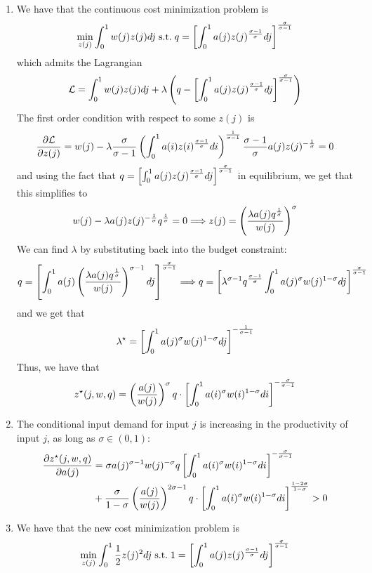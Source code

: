 \documentclass[12pt]{article}
\begin{document}
\begin{enumerate}
	\begin{enumerate}
		\item We have that the continuous cost minimization problem is
		\[
		\min_{z(j)} \int_0^1 w(j)z(j)dj \;\text{s.t.}\; q = \left[ \int_0^1 a(j) z(j)^\frac{\sigma-1}{\sigma} dj \right]^\frac{\sigma}{\sigma-1}
		\]
		which admits the Lagrangian
		\[
		\mathcal{L} = \int_0^1 w(j)z(j)dj + \lambda \left( q - \left[ \int_0^1 a(j) z(j)^\frac{\sigma-1}{\sigma} dj \right]^\frac{\sigma}{\sigma-1} \right)
		\]
		The first order condition with respect to some $z(j)$ is
		\[
		\frac{\partial \mathcal{L}}{\partial z(j)} = w(j) - \lambda \frac{\sigma}{\sigma - 1} \left( \int_0^1 a(i) z(i)^\frac{\sigma - 1}{\sigma}di \right)^\frac{1}{\sigma - 1} \frac{\sigma - 1}{\sigma} a(j) z(j)^{-\frac{1}{\sigma}} = 0
		\]
		and using the fact that $q = \left[ \int_0^1 a(j) z(j)^\frac{\sigma-1}{\sigma} dj \right]^\frac{\sigma}{\sigma-1}$ in equilibrium, we get that this simplifies to
		\[
		w(j) - \lambda a(j)z(j)^{-\frac{1}{\sigma}} q^\frac{1}{\sigma} = 0 \Longrightarrow z(j) = \left( \frac{\lambda a(j) q^\frac{1}{\sigma}}{w(j)} \right)^\sigma
		\]
		We can find $\lambda$ by substituting back into the budget constraint:
		\[
		q = \left[\int_0^1 a(j) \left( \frac{\lambda a(j) q^\frac{1}{\sigma}}{w(j)} \right)^{\sigma-1} dj\right]^\frac{\sigma}{\sigma-1} \Longrightarrow q = \left[ \lambda^{\sigma - 1}q^\frac{\sigma-1}{\sigma} \int_0^1 a(j)^\sigma w(j)^{1-\sigma} dj \right]^\frac{\sigma}{\sigma - 1}
		\]
		and we get that
		\[
		\lambda^\star = \left[ \int_0^1 a(j)^\sigma w(j)^{1-\sigma} dj  \right]^{-\frac{1}{\sigma - 1}}
		\]
		Thus, we have that
		\[
		z^\star(j,w,q) = \left( \frac{a(j)}{w(j)} \right)^\sigma q \cdot \left[ \int_0^1 a(i)^\sigma w(i)^{1-\sigma} di  \right]^{-\frac{\sigma}{\sigma - 1}}
		\]
		\item The conditional input demand for input $j$ is increasing in the productivity of input $j$, as long as $\sigma \in (0,1)$:
		\begin{align*}
		\frac{\partial z^\star(j,w,q)}{\partial a(j)} &= \sigma a(j)^{\sigma - 1}w(j)^{-\sigma} q \left[ \int_0^1 a(i)^\sigma w(i)^{1-\sigma} di  \right]^{-\frac{\sigma}{\sigma - 1}} \\
		 &+ \frac{\sigma}{1-\sigma} \left( \frac{a(j)}{w(j)} \right)^{2\sigma-1} q \cdot \left[ \int_0^1 a(i)^\sigma w(i)^{1-\sigma} di  \right]^{\frac{1-2\sigma}{1-\sigma}} > 0
		\end{align*}
		\item We have that the new cost minimization problem is
		\[
		\min_{z(j)} \int_0^1 \frac{1}{2}z(j)^2 dj \;\text{s.t.}\; 1 = \left[ \int_0^1 a(j) z(j)^\frac{\sigma-1}{\sigma} dj \right]^\frac{\sigma}{\sigma-1}
\]
\end{enumerate}
\end{enumerate}
\end{document}
